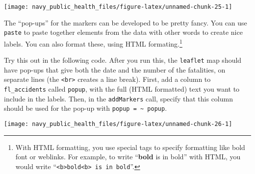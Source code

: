 \documentclass[]{tufte-book}
\newenvironment{Shaded}{}{}
\newcommand{\DataTypeTok}[1]{\textcolor[rgb]{0.56,0.13,0.00}{#1}}
\newcommand{\DecValTok}[1]{\textcolor[rgb]{0.25,0.63,0.44}{#1}}
\newcommand{\FloatTok}[1]{\textcolor[rgb]{0.25,0.63,0.44}{#1}}
\newcommand{\KeywordTok}[1]{\textcolor[rgb]{0.00,0.44,0.13}{\textbf{#1}}}
\newcommand{\NormalTok}[1]{#1}
\newcommand{\OperatorTok}[1]{\textcolor[rgb]{0.40,0.40,0.40}{#1}}
\newcommand{\StringTok}[1]{\textcolor[rgb]{0.25,0.44,0.63}{#1}}
\begin{document}
\texttt{[image: navy\_public\_health\_files/figure-latex/unnamed-chunk-25-1]}

The ``pop-ups'' for the markers can be developed to be pretty fancy. You can use \texttt{paste} to paste
together elements from the data with other words to create nice labels. You can also format these, using
HTML formating.\footnote{With HTML formatting, you use special tags to specify formatting like bold font
  or weblinks. For example, to write ``\textbf{bold} is in bold'' with HTML, you would write
  ``\texttt{\textless{}b\textgreater{}bold\textless{}b\textgreater{}\ is\ in\ bold}''.}

Try this out in the following code. After you run this, the \texttt{leaflet} map should have pop-ups that
give both the date and the number of the fatalities, on separate lines (the \texttt{\textless{}br\textgreater{}} creates a line
break). First, add a column to \texttt{fl\_accidents} called \texttt{popup}, with the full (HTML formatted) text
you want to include in the labels. Then, in the \texttt{addMarkers} call, specify that this column should
be used for the pop-up with \texttt{popup\ =\ \textasciitilde{}\ popup}.

\begin{Shaded}
\end{Shaded}

\texttt{[image: navy\_public\_health\_files/figure-latex/unnamed-chunk-26-1]}
\end{document}
